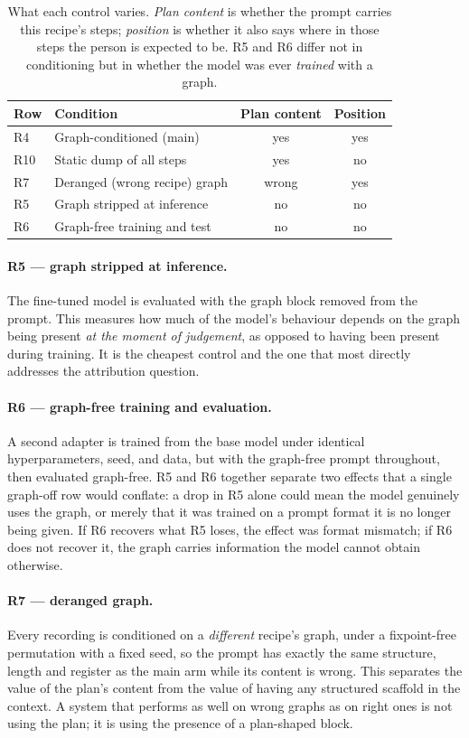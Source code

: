 \documentclass[10pt,twocolumn]{article}
\begin{document}
\begin{table}[t]
\centering\small
\setlength{\tabcolsep}{4pt}
\begin{tabular}{llcc}
\toprule
Row & Condition & Plan content & Position \\
\midrule
R4  & Graph-conditioned (main)      & yes & yes \\
R10 & Static dump of all steps      & yes & no  \\
R7  & Deranged (wrong recipe) graph & wrong & yes \\
R5  & Graph stripped at inference   & no  & no  \\
R6  & Graph-free training and test  & no  & no  \\
\bottomrule
\end{tabular}
\caption{What each control varies. \emph{Plan content} is whether the prompt
carries this recipe's steps; \emph{position} is whether it also says where in
those steps the person is expected to be. R5 and R6 differ not in conditioning
but in whether the model was ever \emph{trained} with a graph.}
\label{tab:controls}
\end{table}

\paragraph{R5 --- graph stripped at inference.} The fine-tuned model is evaluated
with the graph block removed from the prompt. This measures how much of the
model's behaviour depends on the graph being present \emph{at the moment of
judgement}, as opposed to having been present during training. It is the
cheapest control and the one that most directly addresses the attribution
question.

\paragraph{R6 --- graph-free training and evaluation.} A second adapter is
trained from the base model under identical hyperparameters, seed, and data, but
with the graph-free prompt throughout, then evaluated graph-free. R5 and R6
together separate two effects that a single graph-off row would conflate: a drop
in R5 alone could mean the model genuinely uses the graph, or merely that it was
trained on a prompt format it is no longer being given. If R6 recovers what R5
loses, the effect was format mismatch; if R6 does not recover it, the graph
carries information the model cannot obtain otherwise.

\paragraph{R7 --- deranged graph.} Every recording is conditioned on a
\emph{different} recipe's graph, under a fixpoint-free permutation with a fixed
seed, so the prompt has exactly the same structure, length and register as the
main arm while its content is wrong. This separates the value of the plan's
content from the value of having any structured scaffold in the context. A
system that performs as well on wrong graphs as on right ones is not using the
plan; it is using the presence of a plan-shaped block.
\end{document}
